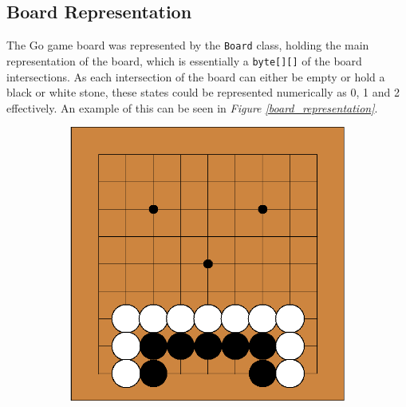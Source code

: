 \documentclass{l3proj}
\begin{document}
\subsection{Board Representation}

The Go game board was represented by the \texttt{Board} class, holding the main representation of the board, which is essentially a \texttt{byte[][]} of the board intersections. As each intersection of the board can either be empty or hold a black or white stone, these states could be represented numerically as 0, 1 and 2 effectively. An example of this can be seen in  \textit{Figure  \ref{board_representation}}.

\begin{figure}[H]
	\centering
	\begin{subfigure}[b]{0.4\textwidth}
		\includegraphics[width=\textwidth]{Images/S33Board_Rep_Example}
	\end{subfigure}\hfill
	\begin{subfigure}[b]{0.4\textwidth}

\end{subfigure}
\end{figure}
\end{document}
